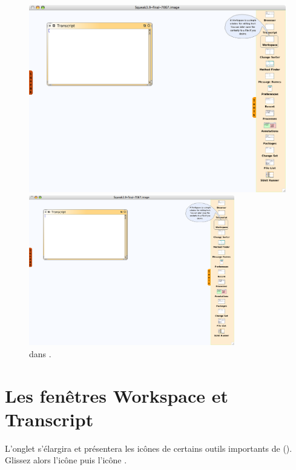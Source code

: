\documentclass[a4paper,10pt,twoside]{book}
\begin{document}
\begin{figure}[htb]
\ifluluelse
	{\centerline {\includegraphics[width=\textwidth]{Tools}}}
	{\centerline {\includegraphics[width=0.8\textwidth]{Tools}}}
\caption{\Toolsflap dans \sq.\label{fig:tools}}
\end{figure}

\section{Les fenêtres Workspace et Transcript}
\label{sec:transcript}

L'onglet s'élargira et présentera les icônes de certains outils importants de \sq (). Glissez alors l'icône  puis l'icône .
\end{document}
